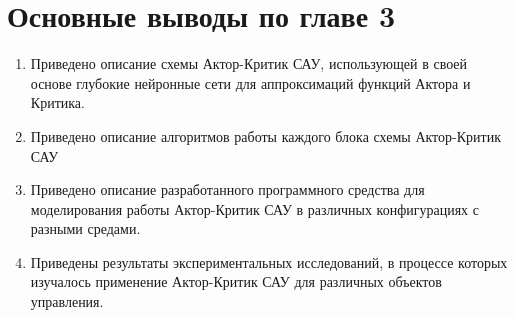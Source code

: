 \section{Основные выводы по главе 3} \label{vivod3}
 
\begin{enumerate}
	\item Приведено описание схемы Актор-Критик САУ, использующей в своей основе глубокие нейронные сети для аппроксимаций функций Актора и Критика.
	\item Приведено описание алгоритмов работы каждого блока схемы Актор-Критик САУ
	\item Приведено описание разработанного программного средства для моделирования работы Актор-Критик САУ в различных конфигурациях с разными средами.
	\item Приведены результаты экспериментальных исследований, в процессе которых изучалось применение Актор-Критик САУ для различных объектов управления.
\end{enumerate}

\clearpage
\clearpage
